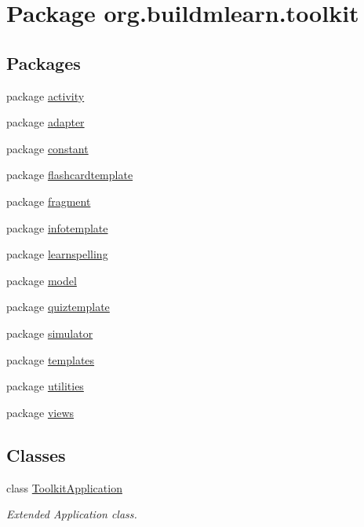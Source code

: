 \hypertarget{namespaceorg_1_1buildmlearn_1_1toolkit}{\section{Package org.\-buildmlearn.\-toolkit}
\label{namespaceorg_1_1buildmlearn_1_1toolkit}
}
\subsection*{Packages}
\begin{DoxyCompactItemize}
\item 
package \hyperlink{namespaceorg_1_1buildmlearn_1_1toolkit_1_1activity}{activity}
\item 
package \hyperlink{namespaceorg_1_1buildmlearn_1_1toolkit_1_1adapter}{adapter}
\item 
package \hyperlink{namespaceorg_1_1buildmlearn_1_1toolkit_1_1constant}{constant}
\item 
package \hyperlink{namespaceorg_1_1buildmlearn_1_1toolkit_1_1flashcardtemplate}{flashcardtemplate}
\item 
package \hyperlink{namespaceorg_1_1buildmlearn_1_1toolkit_1_1fragment}{fragment}
\item 
package \hyperlink{namespaceorg_1_1buildmlearn_1_1toolkit_1_1infotemplate}{infotemplate}
\item 
package \hyperlink{namespaceorg_1_1buildmlearn_1_1toolkit_1_1learnspelling}{learnspelling}
\item 
package \hyperlink{namespaceorg_1_1buildmlearn_1_1toolkit_1_1model}{model}
\item 
package \hyperlink{namespaceorg_1_1buildmlearn_1_1toolkit_1_1quiztemplate}{quiztemplate}
\item 
package \hyperlink{namespaceorg_1_1buildmlearn_1_1toolkit_1_1simulator}{simulator}
\item 
package \hyperlink{namespaceorg_1_1buildmlearn_1_1toolkit_1_1templates}{templates}
\item 
package \hyperlink{namespaceorg_1_1buildmlearn_1_1toolkit_1_1utilities}{utilities}
\item 
package \hyperlink{namespaceorg_1_1buildmlearn_1_1toolkit_1_1views}{views}
\end{DoxyCompactItemize}
\subsection*{Classes}
\begin{DoxyCompactItemize}
\item 
class \hyperlink{classorg_1_1buildmlearn_1_1toolkit_1_1ToolkitApplication}{Toolkit\-Application}
\begin{DoxyCompactList}\small\item\em Extended Application class. \end{DoxyCompactList}\end{DoxyCompactItemize}
